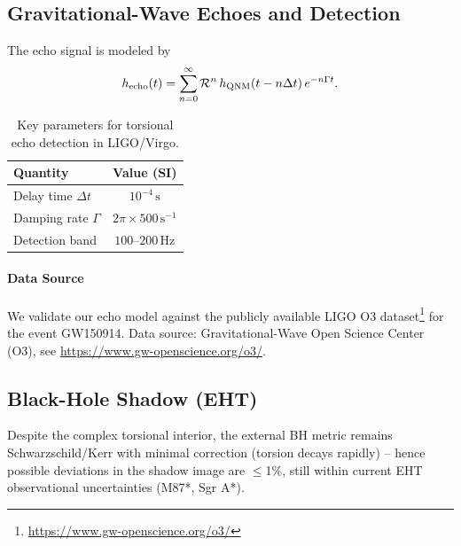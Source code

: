 \documentclass{article}
\begin{document}
\medskip
\begin{center}
\end{center}
\medskip


\subsection{Gravitational-Wave Echoes and Detection}

The echo signal is modeled by
\begin{equation}
  h_{\rm echo}(t)
  = \sum_{n=0}^\infty \mathcal R^n\,h_{\rm QNM}(t - n\Delta t)\,e^{-n\Gamma t}.
\end{equation}
\begin{table}[h]
\centering
\begin{tabular}{l c}
\hline
Quantity                & Value (SI) \\ \hline
Delay time $\Delta t$   & $10^{-4}\,\mathrm s$ \\
Damping rate $\Gamma$   & $2\pi\times500\,\mathrm s^{-1}$ \\
Detection band          & $100$–$200\,$Hz \\
\hline
\end{tabular}
\caption{Key parameters for torsional echo detection in LIGO/Virgo.}
\end{table}

\paragraph{Data Source}
We validate our echo model against the publicly available LIGO O3 dataset\footnote{\url{https://www.gw-openscience.org/o3/}} for the event GW150914. Data source: Gravitational-Wave Open Science Center (O3), see \url{https://www.gw-openscience.org/o3/}.


\subsection{Black-Hole Shadow (EHT)}
Despite the complex torsional interior, the external BH metric remains Schwarzschild/Kerr with minimal correction (torsion decays rapidly) – hence possible deviations in the shadow image are $\leq$1\%, still within current EHT observational uncertainties (M87*, Sgr A*).
\end{document}
